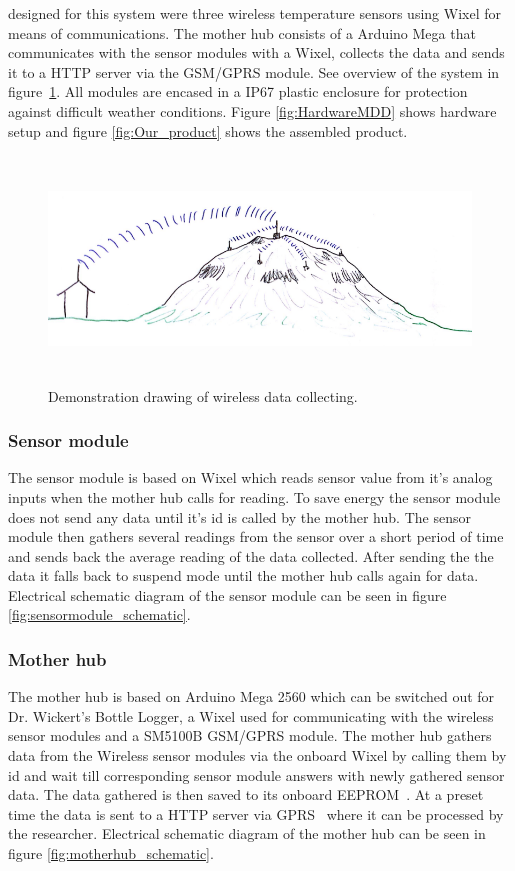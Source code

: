 designed for this system were three wireless temperature sensors using Wixel\cite{wixel}
for means of communications. The mother hub consists of a Arduino Mega\cite{arduinoMega}
that communicates with the sensor modules with a Wixel, collects the data 
and sends it to a HTTP server via the GSM/GPRS module\cite{SM5100B}. See overview of the system in figure~\ref{fig:datalogging}. All modules are 
encased in a IP67\cite{ipRating} plastic enclosure for protection against difficult weather conditions.
Figure \ref{fig:HardwareMDD} shows hardware setup and figure \ref{fig:Our_product} shows the assembled 
product. 
\begin{figure}[H]
		\centering
        \includegraphics[height=6cm]{graphics/GeoLog.PNG}
        \caption{Demonstration drawing of wireless data collecting.}
        \label{fig:datalogging}
\end{figure}
\subsubsection{Sensor module}
The sensor module is based on Wixel\cite{wixel} which reads sensor value from it's
analog inputs when the mother hub calls for reading. To save energy the sensor module does
not send any data until it's id is called by the mother hub. The sensor module then 
gathers several readings from the sensor over a short period of time and sends back the 
average reading of the data collected. After sending the the data it falls back to suspend mode until the mother 
hub calls again for data. Electrical schematic diagram of the sensor module can
be seen in figure \ref{fig:sensormodule_schematic}.
\subsubsection{Mother hub}
The mother hub is based on Arduino Mega 2560\cite{arduinoMega} which can be switched out 
for Dr. Wickert's Bottle Logger\cite{ALog-BottleLogger}, a Wixel\cite{wixel} used for 
communicating with the wireless sensor modules and a SM5100B GSM/GPRS 
module\cite{SM5100B}. The mother hub gathers data from the Wireless sensor modules via 
the onboard Wixel by calling them by id and wait till corresponding sensor module answers
with newly gathered sensor data. The data gathered is then saved to its onboard EEPROM~\cite{EEPROM}.
At a preset time the data is sent to a HTTP server via GPRS~\cite{GPRS} where it can be processed 
by the researcher. Electrical schematic diagram of the mother hub can be seen in figure 
\ref{fig:motherhub_schematic}.
